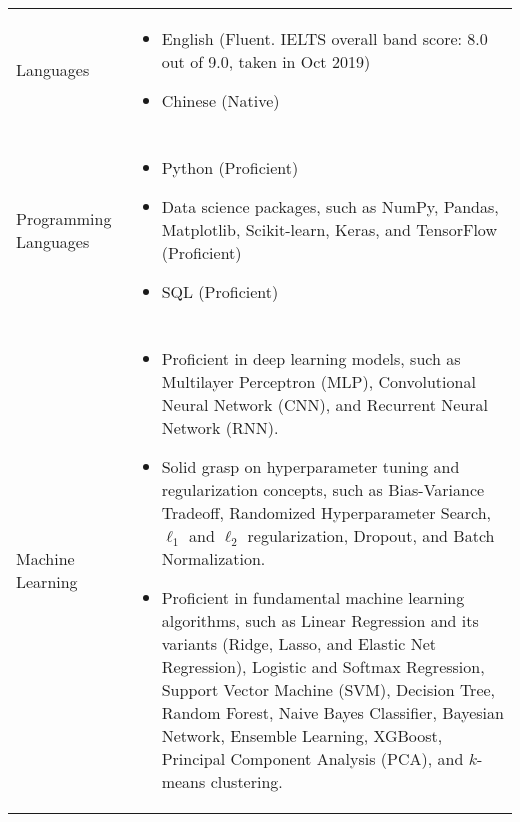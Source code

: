 \documentclass[10pt, oneside]{article}
\begin{document}
\begin{tabularx}{\linewidth}{p{2.2cm}|p{16cm}}
	\toprule 
	Languages
	& \begin{itemize}
		\item English (Fluent. IELTS overall band score: 8.0 out of 9.0, taken in Oct 2019)
		\item Chinese (Native)
	\end{itemize}
	\\\\
	Programming Languages
	& \begin{itemize}
		\item Python (Proficient)
		\item Data science packages, such as NumPy, Pandas, Matplotlib, Scikit-learn, Keras, and TensorFlow (Proficient)
		\item SQL (Proficient)
	\end{itemize}
	\\\\
	Machine Learning
	& \begin{itemize}
		\item Proficient in deep learning models, such as Multilayer Perceptron (MLP), Convolutional Neural Network (CNN), and Recurrent Neural Network (RNN).
		\item Solid grasp on hyperparameter tuning and regularization concepts, such as Bias-Variance Tradeoff, Randomized Hyperparameter Search, $\ell_1$ and $\ell_2$ regularization, Dropout, and Batch Normalization.
		\item Proficient in fundamental machine learning algorithms, such as Linear 
		Regression and its variants (Ridge, Lasso, and Elastic Net Regression), Logistic and Softmax Regression, Support Vector Machine (SVM), Decision Tree, Random Forest, Naive Bayes Classifier, Bayesian Network, Ensemble Learning, XGBoost, Principal Component Analysis (PCA), and $k$-means clustering.
	\end{itemize}

	
	

\end{tabularx}
\end{document}
